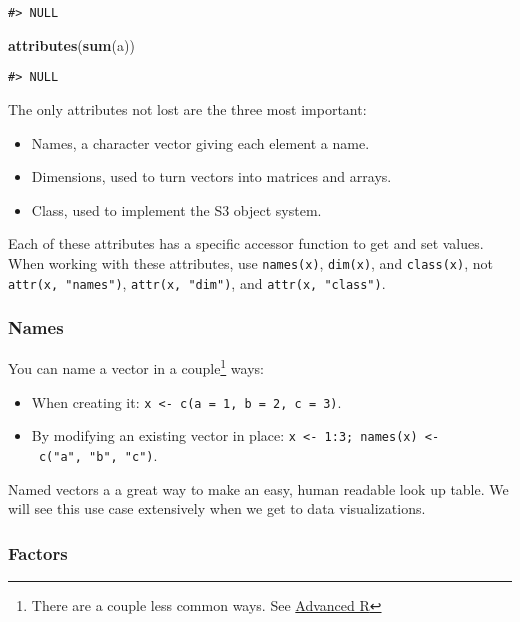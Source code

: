 \documentclass[]{book}
\newenvironment{Shaded}{\begin{snugshade}}{\end{snugshade}}
\newcommand{\KeywordTok}[1]{\textcolor[rgb]{0.13,0.29,0.53}{\textbf{#1}}}
\newcommand{\NormalTok}[1]{#1}
\let\rmarkdownfootnote\footnote%
\def\footnote{\protect\rmarkdownfootnote}
\theoremstyle{definition}
\theoremstyle{definition}
\theoremstyle{definition}
\theoremstyle{remark}
\begin{document}
\begin{verbatim}
#> NULL
\end{verbatim}

\begin{Shaded}
\begin{Highlighting}[]
\KeywordTok{attributes}\NormalTok{(}\KeywordTok{sum}\NormalTok{(a))}
\end{Highlighting}
\end{Shaded}

\begin{verbatim}
#> NULL
\end{verbatim}

The only attributes not lost are the three most important:

\begin{itemize}
\item
  Names, a character vector giving each element a name.
\item
  Dimensions, used to turn vectors into matrices and arrays.
\item
  Class, used to implement the S3 object system.
\end{itemize}

Each of these attributes has a specific accessor function to get and set
values. When working with these attributes, use \texttt{names(x)},
\texttt{dim(x)}, and \texttt{class(x)}, not \texttt{attr(x,\ "names")},
\texttt{attr(x,\ "dim")}, and \texttt{attr(x,\ "class")}.

\subsubsection{Names}\label{names}

You can name a vector in a couple\footnote{There are a couple less
  common ways. See \href{http://adv-r.had.co.nz}{Advanced R}} ways:

\begin{itemize}
\item
  When creating it:
  \texttt{x\ \textless{}-\ c(a\ =\ 1,\ b\ =\ 2,\ c\ =\ 3)}.
\item
  By modifying an existing vector in place:
  \texttt{x\ \textless{}-\ 1:3;\ names(x)\ \textless{}-\ c("a",\ "b",\ "c")}.
\end{itemize}

Named vectors a a great way to make an easy, human readable look up
table. We will see this use case extensively when we get to data
visualizations.

\subsubsection{Factors}\label{factors}
\end{document}
